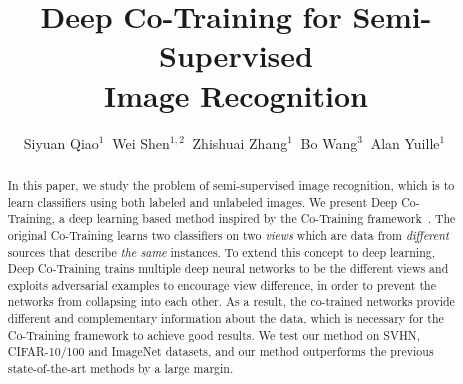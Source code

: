 \documentclass[runningheads]{llncs}
\begin{document}
\pagestyle{headings}
\mainmatter
\def\ECCV18SubNumber{000}  %

\title{Deep Co-Training for Semi-Supervised \\Image Recognition} %



\author{Siyuan Qiao$^1~$ Wei Shen$^{1,2}~$ Zhishuai Zhang$^1~$ Bo Wang$^3~$ Alan Yuille$^1~$}


\maketitle

\begin{abstract}
In this paper, we study the problem of semi-supervised image recognition, which is to learn classifiers using both labeled and unlabeled images.
We present Deep Co-Training, a deep learning based method inspired by the Co-Training framework~\cite{CoT}.
The original Co-Training learns two classifiers on two \textit{views} which are data from \textit{different} sources that describe \textit{the same} instances.
To extend this concept to deep learning, Deep Co-Training trains multiple deep neural networks to be the different views and exploits adversarial examples to encourage view difference, in order to prevent the networks from collapsing into each other.
As a result, the co-trained networks provide different and complementary information about the data, which is necessary for the Co-Training framework to achieve good results.
We test our method on SVHN, CIFAR-10/100 and ImageNet datasets, and our method outperforms the previous state-of-the-art methods by a large margin.

\vspace{-0.1in}
\end{abstract}
\end{document}
